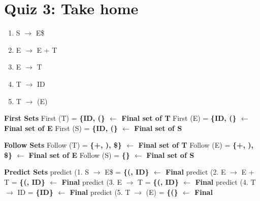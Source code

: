 \documentclass{report}
\begin{document}
\section{Quiz 3: Take home}
\vspace{-1em}
\begin{multicols}{2}
      \begin{enumerate}[label=\arabic*.]
        \item S $\rightarrow$ E\$
        \item E $\rightarrow$ E + T
        \item E $\rightarrow$ T
        \item T $\rightarrow$ ID
        \item T $\rightarrow$ (E)
      \end{enumerate}
\setlength{\leftskip}{-12em}
      \textbf{First Sets}\newline
      First (T) = \textbf{\{ID, (\} $\leftarrow$ Final set of T}\newline
      First (E) = \textbf{\{ID, (\} $\leftarrow$ Final set of E}\newline
      First (S) = \textbf{\{ID, (\} $\leftarrow$ Final set of S}\newline
\end{multicols}
\begin{multicols}{2}
\noindent\textbf{Follow Sets}\newline
    Follow (T) = \textbf{ \{+, ), \$\} $\leftarrow$ Final set of T}\newline
    Follow (E) = \textbf{ \{+, ), \$\} $\leftarrow$ Final set of E}\newline
    Follow (S) =  \textbf{ \{\} $\leftarrow$ Final set of S}\newline\newline\newline

\noindent\textbf{Predict Sets}\newline
    predict (1. S $\rightarrow$ E\$ = \textbf{ \{(, ID\} $\leftarrow$ Final}\newline
    predict (2. E $\rightarrow$ E + T = \textbf{ \{(, ID\} $\leftarrow$ Final}\newline
    predict (3. E $\rightarrow$ T = \textbf{ \{(, ID\} $\leftarrow$ Final}\newline
    predict (4. T $\rightarrow$ ID = \textbf{ \{ID\} $\leftarrow$ Final}\newline
    predict (5. T $\rightarrow$ (E) = \textbf{ \{(\} $\leftarrow$ Final}\newline
\end{multicols}
\end{document}
